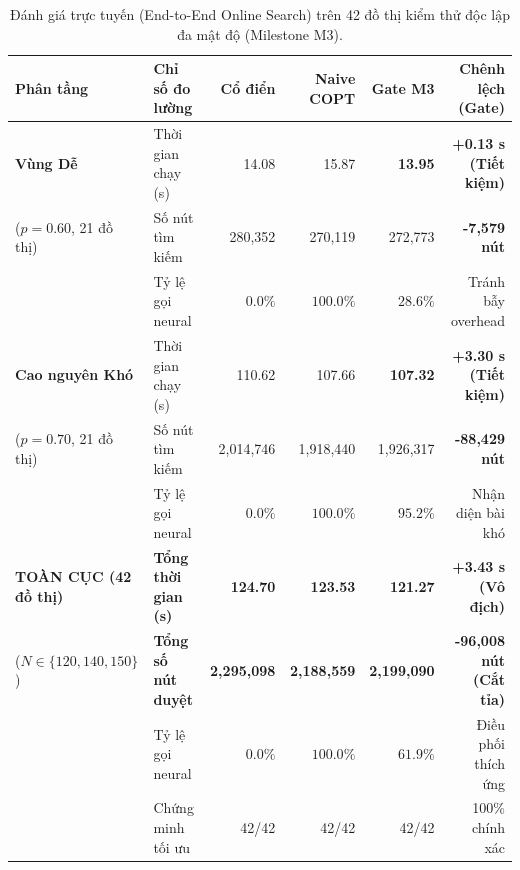 \documentclass[11pt,a4paper]{article}
\begin{document}
\begin{table}[ht]
\centering
\small
\setlength{\tabcolsep}{3.5pt}
\caption{Đánh giá trực tuyến (End-to-End Online Search) trên 42 đồ thị kiểm thử độc lập đa mật độ (Milestone M3).}
\label{tab:m3_eval}
\begin{tabularx}{\linewidth}{lXrrrr}
\toprule
Phân tầng & Chỉ số đo lường & Cổ điển & Naive COPT & \textbf{Gate M3} & Chênh lệch (Gate) \\
\midrule
\textbf{Vùng Dễ} & Thời gian chạy (s) & 14.08 & 15.87 & \textbf{13.95} & \textbf{+0.13 s (Tiết kiệm)} \\
($p = 0.60$, 21 đồ thị) & Số nút tìm kiếm & 280,352 & 270,119 & 272,773 & \textbf{-7,579 nút} \\
& Tỷ lệ gọi neural & $0.0\%$ & $100.0\%$ & $28.6\%$ & Tránh bẫy overhead \\
\midrule
\textbf{Cao nguyên Khó} & Thời gian chạy (s) & 110.62 & 107.66 & \textbf{107.32} & \textbf{+3.30 s (Tiết kiệm)} \\
($p = 0.70$, 21 đồ thị) & Số nút tìm kiếm & 2,014,746 & 1,918,440 & 1,926,317 & \textbf{-88,429 nút} \\
& Tỷ lệ gọi neural & $0.0\%$ & $100.0\%$ & $95.2\%$ & Nhận diện bài khó \\
\midrule
\textbf{TOÀN CỤC (42 đồ thị)} & \textbf{Tổng thời gian (s)} & \textbf{124.70} & \textbf{123.53} & \textbf{121.27} & \textbf{+3.43 s (Vô địch)} \\
($N \in \{120, 140, 150\}$) & \textbf{Tổng số nút duyệt} & \textbf{2,295,098} & \textbf{2,188,559} & \textbf{2,199,090} & \textbf{-96,008 nút (Cắt tỉa)} \\
& Tỷ lệ gọi neural & $0.0\%$ & $100.0\%$ & $61.9\%$ & Điều phối thích ứng \\
& Chứng minh tối ưu & 42/42 & 42/42 & 42/42 & 100\% chính xác \\
\bottomrule
\end{tabularx}
\end{table}
\end{document}
